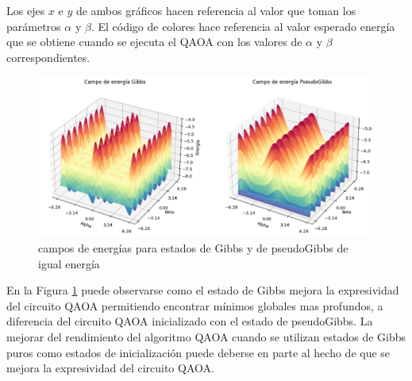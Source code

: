 Los ejes $x$ e $y$ de ambos gráficos hacen referencia al valor que toman los parámetros $\alpha$ y $\beta$. El código de colores hace referencia al valor esperado energía que se obtiene cuando se ejecuta el QAOA con los valores de $\alpha$ y $\beta$ correspondientes.

\newpage

\begin{figure}[!h]
    \centering
    \includegraphics[scale = 0.55]{plt/a07-energy_landscape.png}
    \caption{campos de energías para estados de Gibbs y de pseudoGibbs de igual energía}
    \label{fig:landscape_energy}
\end{figure}

En la Figura \ref{fig:landscape_energy} puede observarse como el estado de Gibbs mejora la expresividad del circuito QAOA permitiendo encontrar mínimos globales mas profundos, a diferencia del circuito QAOA inicializado con el estado de pseudoGibbs. La mejorar del rendimiento del algoritmo QAOA cuando se utilizan estados de Gibbs puros como estados de inicialización puede deberse en parte al hecho de que se mejora la expresividad del circuito QAOA.